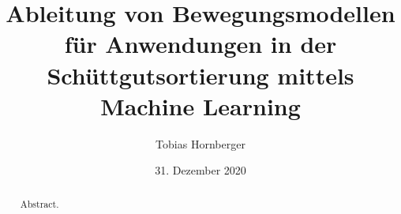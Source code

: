 \documentclass[english,algorithms,reviews,examples]{isasthesis}
\title{Ableitung von Bewegungsmodellen für Anwendungen in der Schüttgutsortierung mittels Machine Learning}
\author{Tobias Hornberger}
\date{31. Dezember 2020}
\begin{document}
    \maketitle

    \begin{abstract}
        Abstract.
    \end{abstract}

    \maketoc


    
    
\end{document}
